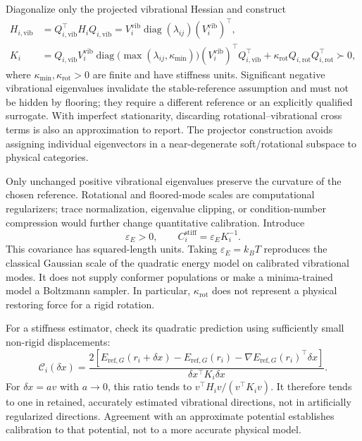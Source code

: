 \documentclass[11pt,letterpaper]{article}
\newcommand{\epsE}{\varepsilon_E}
\newcommand{\diag}{\operatorname{diag}}
\newcommand{\rot}{\mathrm{rot}}
\newcommand{\vib}{\mathrm{vib}}
\begin{document}
Diagonalize only the projected vibrational Hessian and construct
\begin{equation}\label{eq:stiffness}
\begin{aligned}
H_{i,\vib}&=Q_{i,\vib}^{\top}H_iQ_{i,\vib}
=V_i^{\vib}\diag(\lambda_{ij})(V_i^{\vib})^\top,\\
K_i&=Q_{i,\vib}V_i^{\vib}\diag\!\big(\max(\lambda_{ij},\kappa_{\min})\big)
(V_i^{\vib})^\top Q_{i,\vib}^{\top}
+\kappa_{\rot}Q_{i,\rot}Q_{i,\rot}^{\top}\succ0,
\end{aligned}
\end{equation}
where $\kappa_{\min},\kappa_{\rot}>0$ are finite and have stiffness units. Significant negative vibrational eigenvalues invalidate the stable-reference assumption and must not be hidden by flooring; they require a different reference or an explicitly qualified surrogate. With imperfect stationarity, discarding rotational--vibrational cross terms is also an approximation to report. The projector construction avoids assigning individual eigenvectors in a near-degenerate soft/rotational subspace to physical categories.

Only unchanged positive vibrational eigenvalues preserve the curvature of the chosen reference. Rotational and floored-mode scales are computational regularizers; trace normalization, eigenvalue clipping, or condition-number compression would further change quantitative calibration. Introduce
\begin{equation}\label{eq:cstiff}
\epsE>0,\qquad C_i^{\mathrm{stiff}}=\epsE K_i^{-1}.
\end{equation}
This covariance has squared-length units. Taking $\epsE=k_BT$ reproduces the classical Gaussian scale of the quadratic energy model on calibrated vibrational modes. It does not supply conformer populations or make a minima-trained model a Boltzmann sampler. In particular, $\kappa_{\rot}$ does not represent a physical restoring force for a rigid rotation.

For a stiffness estimator, check its quadratic prediction using sufficiently small non-rigid displacements:
\begin{equation}\label{eq:calibration}
\mathcal C_i(\delta x)=
\frac{2\left[E_{\mathrm{ref},G}(r_i+\delta x)-E_{\mathrm{ref},G}(r_i)
-\nabla E_{\mathrm{ref},G}(r_i)^\top\delta x\right]}{\delta x^\top K_i\delta x}.
\end{equation}
For $\delta x=a v$ with $a\to0$, this ratio tends to $v^\top H_iv/(v^\top K_iv)$. It therefore tends to one in retained, accurately estimated vibrational directions, not in artificially regularized directions. Agreement with an approximate potential establishes calibration to that potential, not to a more accurate physical model.
\end{document}
